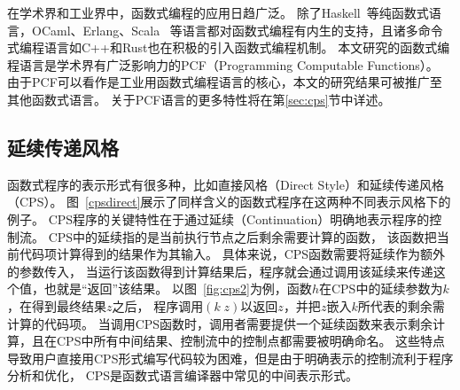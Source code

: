 在学术界和工业界中，函数式编程的应用日趋广泛。
除了Haskell~\cite{o2008real}等纯函数式语言，OCaml、Erlang、Scala~\cite{cesarini2009erlang, odersky2014unifying}
等语言都对函数式编程有内生的支持，且诸多命令式编程语言如C++和Rust也在积极的引入函数式编程机制。
本文研究的函数式编程语言是学术界有广泛影响力的PCF（Programming Computable Functions）。
由于PCF可以看作是工业用函数式编程语言的核心，本文的研究结果可被推广至其他函数式语言。
关于PCF语言的更多特性将在第\ref{sec:cps}节中详述。

\subsection{延续传递风格} \label{sec:bg_cps}

函数式程序的表示形式有很多种，比如直接风格（Direct Style）和延续传递风格（CPS）。
图~\ref{cpsdirect}展示了同样含义的函数式程序在这两种不同表示风格下的例子。
CPS程序的关键特性在于通过延续（Continuation）明确地表示程序的控制流。
CPS中的延续指的是当前执行节点之后剩余需要计算的函数，
该函数把当前代码项计算得到的结果作为其输入。
具体来说，CPS函数需要将延续作为额外的参数传入，
当运行该函数得到计算结果后，程序就会通过调用该延续来传递这个值，也就是``返回''该结果。
以图~\ref{fig:cps2}为例，函数$h$在CPS中的延续参数为$k$，在得到最终结果$z$之后，
程序调用$(k\; z)$以返回$z$，并把$z$嵌入$k$所代表的剩余需计算的代码项。
当调用CPS函数时，调用者需要提供一个延续函数来表示剩余计算，且在CPS中所有中间结果、控制流中的控制点都需要被明确命名。
这些特点导致用户直接用CPS形式编写代码较为困难，但是由于明确表示的控制流利于程序分析和优化，
CPS是函数式语言编译器中常见的中间表示形式。

